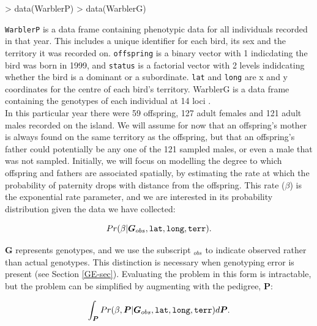 \documentclass{article}
\begin{document}
\begin{Schunk}
\begin{Sinput}
> data(WarblerP)
> data(WarblerG)
\end{Sinput}
\end{Schunk}

 \texttt{WarblerP} is a data frame containing phenotypic data for all individuals recorded in that year.  This includes a unique identifier for each bird, its sex and the territory it was recorded on. \texttt{offspring} is a binary vector with 1 indicdating the bird was born in 1999, and \texttt{status} is a factorial vector with 2 levels indidcating whether the bird is a dominant or a subordinate. \texttt{lat} and \texttt{long} are x and y coordinates for the centre of each bird's territory. {WarblerG} is a data frame containing the genotypes of each individual at 14 loci \citep{Richardson.2000}.\\

In this particular year there were 59 offspring, 127 adult females and 121 adult males recorded on the island.  We will assume for now that an offspring's mother is always found on the same territory as the offspring, but that an offspring's father could potentially be any one of the 121 sampled males, or even a male that was not sampled.  Initially, we will focus on modelling the degree to which offspring and fathers are associated spatially, by estimating the rate at which the probability of paternity drops with distance from the offspring.  This rate ($\beta$) is the exponential rate parameter, and we are interested in its probability distribution given the data we have collected:


\begin{equation}
Pr(\beta | \bm{G}_{obs}, \textrm{\texttt{lat}}, \textrm{\texttt{long}}, \textrm{\texttt{terr}}).
\label{no_pedigree-eq}
\end{equation}

$\bm{G}$ represents genotypes, and we use the subscript $_{obs}$ to indicate observed rather than actual genotypes. This distinction is necessary when genotyping error is present (see Section \ref{GE-sec}).  Evaluating the problem in this form is intractable, but the problem can be simplified by augmenting with the pedigree, $\bm{P}$:

\begin{equation}
\int_{\bm P}Pr(\beta,  {\bm P}| \bm{G}_{obs}, \textrm{\texttt{lat}}, \textrm{\texttt{long}}, \textrm{\texttt{terr}})d{\bm P}.
\label{pedigree-eq}
\end{equation}
\end{document}
